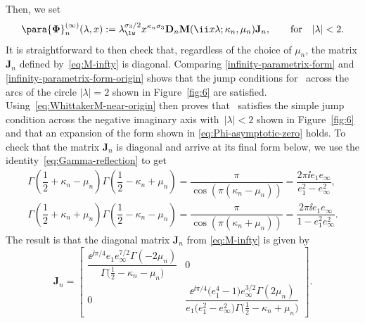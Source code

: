 Then, we set
\begin{equation}
 \para{\boldsymbol{\Phi}}_n^{(\infty)}(\lambda,x):= \lambda_{\lw}^{\sigma_3/2}x^{\kappa_n\sigma_3}\mathbf{D}_n\mathbf{M}(\ii x\lambda;\kappa_n,\mu_n)\mathbf{J}_n,\qquad\text{for} \quad |\lambda|<2.
 \label{infinity-parametrix-form-origin}
\end{equation}
It is straightforward to then check that, regardless of the choice of $\mu_n$,
the matrix $\mathbf{J}_n$ defined by~\eqref{eq:M-infty} is diagonal. Comparing \eqref{infinity-parametrix-form} and \eqref{infinity-parametrix-form-origin} shows that the jump conditions for~ across the arcs of the circle $|\lambda|=2$ shown in Figure~\ref{fig:6} are satisfied. Using~\eqref{eq:WhittakerM-near-origin} then proves that~ satisfies the simple jump condition across the negative imaginary axis with~${|\lambda|<2}$ shown in Figure~\ref{fig:6} and that an expansion of the form shown in \eqref{eq:Phi-asymptotic-zero} holds.
To check that the matrix $\mathbf{J}_n$ is diagonal and arrive at its final form below, we use the identity~\eqref{eq:Gamma-reflection} to get
\begin{gather}
\Gamma\left( \dfrac{1}{2} + \kappa_n - \mu_n \right) \Gamma\left( \dfrac{1}{2} - \kappa_n + \mu_n \right) = \dfrac{\pi}{\cos \left( \pi (\kappa_n - \mu_n)\right)} = \dfrac{2 \pi \ii e_1e_\infty}{e_1^2 - e_\infty^2}, \nonumber\\
\Gamma\left( \dfrac{1}{2} + \kappa_n + \mu_n \right) \Gamma\left( \dfrac{1}{2} - \kappa_n - \mu_n \right) = \dfrac{\pi}{\cos \left( \pi (\kappa_n + \mu_n)\right)} = \dfrac{2\pi \ii e_1e_\infty}{1 - e_1^2 e_\infty^2}.\label{eq:cosine-identity-1}
\end{gather}
The result is that the diagonal matrix $\mathbf{J}_n$ from \eqref{eq:M-infty} is given by
\begin{equation}
\mathbf{J}_n =
\begin{bmatrix}\dfrac{\ee^{{\ii\pi/4}} e_1 e_\infty^{7/2} \Gamma(-2 \mu_n )}{\Gamma \big(\frac{1}{2}-\kappa_n -\mu_n \big)}&0 \\
0&\dfrac{\ee^{{\ii\pi/4}} \big(e_1^4-1\big) e_\infty^{3/2} \Gamma(2 \mu_n )}{e_1 \big(e_1^2-e_\infty^2\big) \Gamma \big(\frac{1}{2}-\kappa_n +\mu_n \big)}
\label{eq:J-n}
\end{bmatrix}.
\end{equation}

